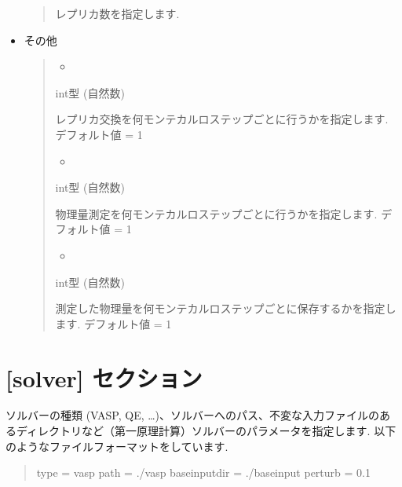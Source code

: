 \documentclass[letterpaper,10pt,dvipdfmx]{sphinxmanual}
\begin{document}
\begin{itemize}
\begin{quote}
 レプリカ数を指定します.
\end{quote}

\item {} 
その他
\begin{quote}
\begin{itemize}
\item {} 

\end{itemize}

 int型 (自然数)

     レプリカ交換を何モンテカルロステップごとに行うかを指定します. デフォルト値 = 1
\begin{itemize}
\item {} 

\end{itemize}

 int型 (自然数)

     物理量測定を何モンテカルロステップごとに行うかを指定します. デフォルト値 = 1
\begin{itemize}
\item {} 

\end{itemize}

 int型 (自然数)

     測定した物理量を何モンテカルロステップごとに保存するかを指定します. デフォルト値 = 1
\end{quote}

\end{itemize}


\section{{[}solver{]} セクション}
\label{\detokenize{file_specification/parameter_solver::doc}}\label{\detokenize{file_specification/parameter_solver:solver}}
ソルバーの種類 (VASP, QE, …)、ソルバーへのパス、不変な入力ファイルのあるディレクトリなど（第一原理計算）ソルバーのパラメータを指定します.
以下のようなファイルフォーマットをしています.
\begin{quote}

\begin{sphinxVerbatim}[commandchars=\\\{\}]
[solver]
type = \PYGZsq{}vasp\PYGZsq{}
path = \PYGZsq{}./vasp\PYGZsq{}
base\PYGZus{}input\PYGZus{}dir = \PYGZsq{}./baseinput\PYGZsq{}
perturb = 0.1
\end{sphinxVerbatim}
\end{quote}
\end{document}
